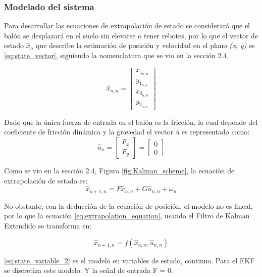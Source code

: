 		\subsubsection*{Modelado del sistema}
Para desarrollar las ecuaciones de extrapolación de estado se considerará que el balón se desplazará en el suelo sin elevarse o tener rebotes, por lo que el vector de estado $\hat{x}_n$ que describe la estimación de posición y velocidad en el plano \textit{(x, y)} es \ref{eq:state_vector}, siguiendo la nomenclatura que se vio en la sección 2.4.

\begin{equation}
\hat{x}_{n,n} = \begin{bmatrix}
x_{1_{n,n}}\\ 
y_{1_{n,n}}\\ 
x_{2_{n,n}}\\ 
y_{2_{n,n}}
\end{bmatrix}
\label{eq:state_vector}
\end{equation}

Dado que la única fuerza de entrada en el balón es la fricción, la cual depende del coeficiente de fricción dinámica y la gravedad el vector \textit{û} es representado como:
\begin{equation}
\hat{u}_n = \begin{bmatrix}
F_x\\
F_y
\end{bmatrix} = 
\begin{bmatrix}
0\\
0
\end{bmatrix}
\label{eq:input_signal}
\end{equation}


Como se vio en la sección 2.4, Figura \ref{fig:Kalman_scheme}, la ecuación de extrapolación de estado es:
\begin{equation}
\hat{x}_{n+1,n} = F \hat{x}_{n,n} + G \hat{u}_{n,n} + \omega_n
\label{eq:extrapolation_equation}
\end{equation}

No obstante, con la deducción de la ecuación de posición, el modelo no es lineal, por lo que la ecuación \ref{eq:extrapolation_equation}, usando el Filtro de Kalman Extendido se transforma en:

\begin{equation}
\hat{x}_{n+1,n} = f(\hat{x}_{n,n}, \hat{u}_{n,n}) 
\label{eq:efk}
\end{equation}


\ref{eq:state_variable_2} es el modelo en variables de estado, continuo. Para el EKF se discretiza este modelo. Y la señal de entrada F = 0. 

